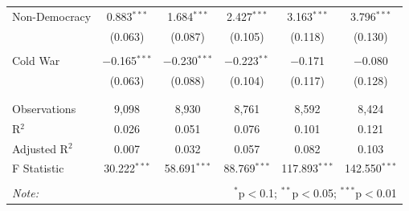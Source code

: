 \documentclass[
  12pt,
]{report}
\begin{document}
\begin{table}
{\begin{tabular}{@{\extracolsep{10pt}}lccccc}
 Non-Democracy & 0.883$^{***}$ & 1.684$^{***}$ & 2.427$^{***}$ & 3.163$^{***}$ & 3.796$^{***}$ \\ 
  & (0.063) & (0.087) & (0.105) & (0.118) & (0.130) \\ 
  & & & & & \\ 
 Cold War & $-$0.165$^{***}$ & $-$0.230$^{***}$ & $-$0.223$^{**}$ & $-$0.171 & $-$0.080 \\ 
  & (0.063) & (0.088) & (0.104) & (0.117) & (0.128) \\ 
  & & & & & \\ 
\hline \\[-1.8ex] 
Observations & 9,098 & 8,930 & 8,761 & 8,592 & 8,424 \\ 
R$^{2}$ & 0.026 & 0.051 & 0.076 & 0.101 & 0.121 \\ 
Adjusted R$^{2}$ & 0.007 & 0.032 & 0.057 & 0.082 & 0.103 \\ 
F Statistic & 30.222$^{***}$ & 58.691$^{***}$ & 88.769$^{***}$ & 117.893$^{***}$ & 142.550$^{***}$ \\ 
\hline 
\hline \\[-1.8ex] 
\textit{Note:}  & \multicolumn{5}{r}{$^{*}$p$<$0.1; $^{**}$p$<$0.05; $^{***}$p$<$0.01} \\ 
\end{tabular}

}

\end{table}%
\end{document}
